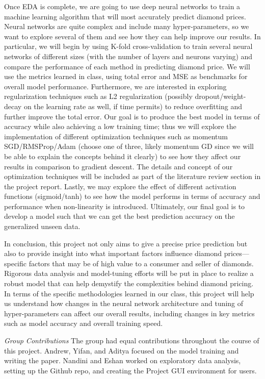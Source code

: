\documentclass[conference]{IEEEtran}
\begin{document}
Once EDA is complete, we are going to use deep neural networks to train a machine learning algorithm that will most accurately predict diamond prices. Neural networks are quite complex and include many hyper-parameters, so we want to explore several of them and see how they can help improve our results. In particular, we will begin by using K-fold cross-validation to train several neural networks of different sizes (with the number of layers and neurons varying) and compare the performance of each method in predicting diamond price. We will use the metrics learned in class, using total error and MSE as benchmarks for overall model performance. Furthermore, we are interested in exploring regularization techniques such as L2 regularization (possibly dropout/weight-decay on the learning rate as well, if time permits) to reduce overfitting and further improve the total error. Our goal is to produce the best model in terms of accuracy while also achieving a low training time; thus we will explore the implementation of different optimization techniques such as momentum SGD/RMSProp/Adam (choose one of three, likely momentum GD since we will be able to explain the concepts behind it clearly) to see how they affect our results in comparison to gradient descent. The details and concept of our optimization techniques will be included as part of the literature review section in the project report. Lastly, we may explore the effect of different activation functions (sigmoid/tanh) to see how the model performs in terms of accuracy and performance when non-linearity is introduced. Ultimately, our final goal is to develop a model such that we can get the best prediction accuracy on the generalized unseen data. 

In conclusion, this project not only aims to give a precise price prediction but also to provide insight into what important factors influence diamond prices—specific factors that may be of high value to a consumer and seller of diamonds. Rigorous data analysis and model-tuning efforts will be put in place to realize a robust model that can help demystify the complexities behind diamond pricing. In terms of the specific methodologies learned in our class, this project will help us understand how changes in the neural network architecture and tuning of hyper-parameters can affect our overall results, including changes in key metrics such as model accuracy and overall training speed. 

\emph{Group Contributions} The group had equal contributions throughout the course of this project. Andrew, Yifan, and Aditya focused on the model training and writing the paper. Nandini and Eshan worked on exploratory data analysis, setting up the Github repo, and creating the Project GUI environment for users. 
\end{document}
